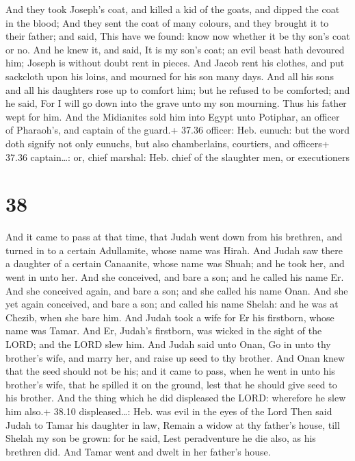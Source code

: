  And they took Joseph's coat, and killed a kid of the
goats, and dipped the coat in the blood;  And they sent the
coat of many colours, and they brought it to their father; and said,
This have we found: know now whether it be thy son's coat or no.
 And he knew it, and said, It is my son's coat; an evil
beast hath devoured him; Joseph is without doubt rent in pieces.
 And Jacob rent his clothes, and put sackcloth upon his
loins, and mourned for his son many days.  And all his sons
and all his daughters rose up to comfort him; but he refused to be
comforted; and he said, For I will go down into the grave unto my son
mourning. Thus his father wept for him.  And the Midianites
sold him into Egypt unto Potiphar, an officer of Pharaoh's, and captain
of the guard.+ 37.36 officer: Heb. eunuch: but the word doth signify not
only eunuchs, but also chamberlains, courtiers, and officers+ 37.36
captain\ldots: or, chief marshal: Heb. chief of the slaughter men, or
executioners

\hypertarget{section-37}{%
\section{38}\label{section-37}}

 And it came to pass at that time, that Judah went down from
his brethren, and turned in to a certain Adullamite, whose name was
Hirah.  And Judah saw there a daughter of a certain
Canaanite, whose name was Shuah; and he took her, and went in unto her.
 And she conceived, and bare a son; and he called his name
Er.  And she conceived again, and bare a son; and she called
his name Onan.  And she yet again conceived, and bare a son;
and called his name Shelah: and he was at Chezib, when she bare him.
 And Judah took a wife for Er his firstborn, whose name was
Tamar.  And Er, Judah's firstborn, was wicked in the sight
of the LORD; and the LORD slew him.  And Judah said unto
Onan, Go in unto thy brother's wife, and marry her, and raise up seed to
thy brother.  And Onan knew that the seed should not be his;
and it came to pass, when he went in unto his brother's wife, that he
spilled it on the ground, lest that he should give seed to his brother.
 And the thing which he did displeased the LORD: wherefore
he slew him also.+ 38.10 displeased\ldots: Heb. was evil in the eyes of
the Lord  Then said Judah to Tamar his daughter in law,
Remain a widow at thy father's house, till Shelah my son be grown: for
he said, Lest peradventure he die also, as his brethren did. And Tamar
went and dwelt in her father's house.

